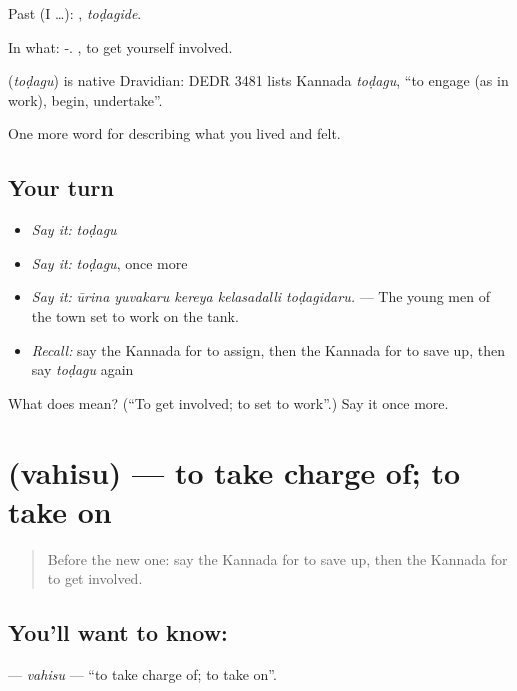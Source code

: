 Past (I …): , \emph{toḍagide}.

In what: -. , to get yourself involved.

\begin{cousinweb}
\textbf{} (\emph{toḍagu}) is native Dravidian: DEDR 3481 lists Kannada \emph{toḍagu}, \textquotedblleft{}to engage (as in work), begin, undertake\textquotedblright{}.
\end{cousinweb}

\begin{grammarlens}[title={What you've built}]
One more word for describing what you lived and felt.
\end{grammarlens}

\subsection*{Your turn}
\begin{itemize}
\raggedright
  \item \emph{Say it:} \emph{toḍagu}
  \item \emph{Say it:} \emph{toḍagu}, once more
  \item \emph{Say it:} \emph{ūrina yuvakaru kereya kelasadalli toḍagidaru.} — The young men of the town set to work on the tank.
  \item \emph{Recall:} say the Kannada for to assign, then the Kannada for to save up, then say \emph{toḍagu} again
\end{itemize}

\begin{tcolorbox}[breakable,colback=teal!4,colframe=teal!35!black,title={Before you move on}]
What does  mean? (\textquotedblleft{}To get involved; to set to work\textquotedblright{}.) Say it once more.
\end{tcolorbox}
\section[\texorpdfstring{\kn{ವಹಿಸು} (vahisu)}{ವಹಿಸು (vahisu)}]{ (vahisu) — to take charge of; to take on}

\label{lesson:KA-C520-vahisu}



\begin{quote}
Before the new one: say the Kannada for to save up, then the Kannada for to get involved.
\end{quote}

\subsection*{You'll want to know: }
\textbf{} — \emph{vahisu} — \textquotedblleft{}to take charge of; to take on\textquotedblright{}.

